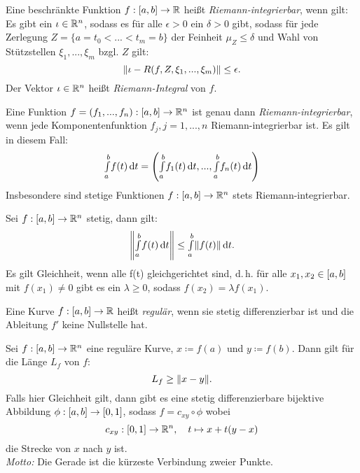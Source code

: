 \documentclass{cheat-sheet}
\begin{document}

\begin{defn}
  Eine beschränkte Funktion $f : \left[ a, b \right] \to \mathbb{R}$ heißt \emph{Riemann-integrierbar}, wenn gilt: Es gibt ein $\iota \in \mathbb{R}^n$, sodass es für alle $\epsilon > 0$ ein $\delta > 0$ gibt, sodass für jede Zerlegung $Z = \{ a = t_0 < ... < t_m = b \}$ der Feinheit $\mu_Z \le \delta$ und Wahl von Stützstellen $\xi_1, ..., \xi_m$ bzgl. $Z$ gilt:
  \[ \lVert\iota - R(f, Z, \xi_1, ..., \xi_m)\rVert \le \epsilon. \]
  Der Vektor $\iota \in \mathbb{R}^n$ heißt \emph{Riemann-Integral} von $f$.
\end{defn}

\begin{bem}
  Eine Funktion $f = (f_1, ..., f_n) : \left[ a, b \right] \to \mathbb{R}^n$ ist genau dann \emph{Riemann-integrierbar}, wenn jede Komponentenfunktion $f_j, j = 1, ..., n$ Riemann-integrierbar ist. Es gilt in diesem Fall:
  \[ {\textstyle \int\limits_{a}^{b}} f(t) \,\mathrm{d} t = \left( {\textstyle \int\limits_{a}^{b}} f_1(t) \,\mathrm{d} t, ..., {\textstyle \int\limits_{a}^{b}} f_n(t) \,\mathrm{d} t \right) \]
  Insbesondere sind stetige Funktionen $f : \left[ a, b \right] \to \mathbb{R}^n$ stets Riemann-integrierbar.
\end{bem}

\begin{satz}
  Sei $f : \left[ a, b \right] \to \mathbb{R}^n$ stetig, dann gilt:
  \[ \left\| {\textstyle \int\limits_{a}^{b}} f(t) \,\mathrm{d} t \right\| \le {\textstyle \int\limits_{a}^{b}} \lVert f(t)\rVert \,\mathrm{d} t. \]
  Es gilt Gleichheit, wenn alle f(t) gleichgerichtet sind, d.\,h. für alle $x_1, x_2 \in \left[ a, b \right]$ mit $f(x_1) \not= 0$ gibt es ein $\lambda \ge 0$, sodass $f(x_2) = \lambda f(x_1)$.
\end{satz}

\begin{defn}
  Eine Kurve $f : \left[ a, b \right] \to \mathbb{R}$ heißt \emph{regulär}, wenn sie stetig differenzierbar ist und die Ableitung $f'$ keine Nullstelle hat.
\end{defn}

\begin{kor}
  Sei $f : \left[ a, b \right] \to \mathbb{R}^n$ eine reguläre Kurve, $x \coloneqq f(a)$ und $y \coloneqq f(b)$. Dann gilt für die Länge $L_f$ von $f$:
  \[ L_f \ge \lVert x - y\rVert. \]
  Falls hier Gleichheit gilt, dann gibt es eine stetig differenzierbare bijektive Abbildung $\phi : \left[ a, b \right] \to \left[ 0, 1 \right]$, sodass $f = c_{xy} \circ \phi$ wobei
  \[ c_{xy} : \left[ 0, 1 \right] \to \mathbb{R}^n,\quad t \mapsto x + t(y - x) \]
  die Strecke von $x$ nach $y$ ist.\\
  \textit{Motto:} Die Gerade ist die kürzeste Verbindung zweier Punkte.
\end{kor}
\end{document}
